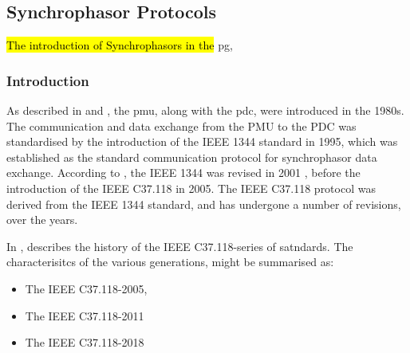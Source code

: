 
\subsection{Synchrophasor Protocols}

\hl{The introduction of Synchrophasors in the} \acrlong{pg}, 

\subsubsection{Introduction}



As described in \cite{martin2011synchrophasor} and \cite{ali2016performance}, the \acrfull{pmu}, along with the \acrfull{pdc}, were introduced in the 1980s. The communication and data exchange from the PMU to the PDC was standardised by the introduction of the IEEE 1344 standard in 1995, which was established as the standard communication protocol for synchrophasor data exchange. According to \cite{appasani2018review}, the IEEE 1344 was revised in 2001 , before the introduction of the IEEE C37.118 in 2005. The  IEEE C37.118 protocol was derived from the IEEE 1344 standard, and has undergone a number of revisions, over the years.


In \cite{martin2013synchrophasor}, \citeauthor{martin2013synchrophasor}describes the history of the 
IEEE C37.118-series of satndards. The characterisitcs of the various generations, might be summarised as:
\begin{itemize}
    \item The IEEE C37.118-2005,
    \item The IEEE C37.118-2011
    \item The IEEE C37.118-2018
\end{itemize}

